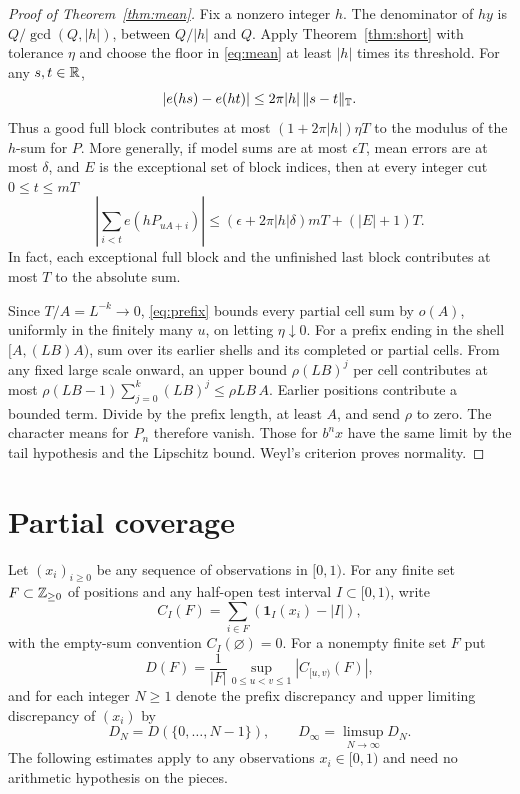 \documentclass[11pt]{article}
\newcommand{\circabs}[1]{\lVert #1\rVert_{\T}}
\begin{document}
\begin{proof}[Proof of Theorem~\ref{thm:mean}]
Fix a nonzero integer \(h\). The denominator of \(hy\) is \(Q/\gcd(Q,|h|)\), between \(Q/|h|\) and \(Q\). Apply Theorem~\ref{thm:short} with tolerance \(\eta\) and choose the floor in \eqref{eq:mean} at least \(|h|\) times its threshold. For any \(s,t\in\mathbb R\),
\[
 |e(hs)-e(ht)|\le 2\pi |h|\,\circabs{s-t}.
\]
Thus a good full block contributes at most \((1+2\pi |h|)\eta T\) to the modulus of the \(h\)-sum for \(P\). More generally, if model sums are at most \(\epsilon T\), mean errors are at most \(\delta\), and \(E\) is the exceptional set of block indices, then at every integer cut \(0\le t\le mT\)
\begin{equation}\label{eq:prefix}
 \left|\sum_{i<t}e(h P_{uA+i})\right|
 \le(\epsilon+2\pi |h|\delta)mT+(|E|+1)T .
\end{equation}
In fact, each exceptional full block and the unfinished last block contributes at most \(T\) to the absolute sum.

Since \(T/A=L^{-k}\to0\), \eqref{eq:prefix} bounds every partial cell sum by \(o(A)\), uniformly in the finitely many \(u\), on letting \(\eta\downarrow0\). For a prefix ending in the shell \([A,(LB)A)\), sum over its earlier shells and its completed or partial cells. From any fixed large scale onward, an upper bound \(\rho (LB)^j\) per cell contributes at most \(\rho (LB-1)\sum_{j=0}^k (LB)^j\le \rho LB\,A\). Earlier positions contribute a bounded term. Divide by the prefix length, at least \(A\), and send \(\rho\) to zero. The character means for \(P_n\) therefore vanish. Those for \(b^nx\) have the same limit by the tail hypothesis and the Lipschitz bound. Weyl's criterion \cite[\S1]{weyl} proves normality.
\end{proof}

\section{Partial coverage}\label{sec:cover}
Let \((x_i)_{i\ge0}\) be any sequence of observations in \([0,1)\). For any finite set \(F\subset\mathbb Z_{\ge0}\) of positions and any half-open test interval \(I\subset[0,1)\), write
\[
 C_I(F)=\sum_{i\in F}(\mathbf1_I(x_i)-|I|),
\]
with the empty-sum convention \(C_I(\varnothing)=0\). For a nonempty finite set \(F\) put
\[
 D(F)=\frac{1}{|F|}\sup_{0\le u<v\le1} |C_{[u,v)}(F)|,
\]
and for each integer \(N\ge1\) denote the prefix discrepancy and upper limiting discrepancy of \((x_i)\) by
\[
 D_N=D(\{0,\ldots,N-1\}),\qquad D_\infty=\limsup_{N\to\infty}D_N.
\]
The following estimates apply to any observations \(x_i\in[0,1)\) and need no arithmetic hypothesis on the pieces.
\end{document}
